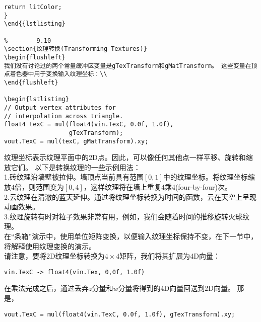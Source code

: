 \begin{lstlisting}[escapechar=^]
    return litColor;
}
\end{{lstlisting}

%------- 9.10 ---------------
\section{纹理转换(Transforming Textures)}
\begin{flushleft}
我们没有讨论过的两个常量缓冲区变量是gTexTransform和gMatTransform。 这些变量在顶点着色器中用于变换输入纹理坐标：\\
\end{flushleft}

\begin{lstlisting}
// Output vertex attributes for 
// interpolation across triangle.
float4 texC = mul(float4(vin.TexC, 0.0f, 1.0f),
                  gTexTransform);
vout.TexC = mul(texC, gMatTransform).xy;
\end{lstlisting}

\begin{flushleft}
纹理坐标表示纹理平面中的2D点。因此，可以像任何其他点一样平移、旋转和缩放它们。 以下是转换纹理的一些示例用法：\\
1.砖纹理沿墙壁被拉伸。墙顶点当前具有范围$[0,1]$中的纹理坐标。将纹理坐标缩放$4$倍，则范围变为$[0,4]$，这样纹理将在墙上重复4乘4(four-by-four)次。\\

2.云纹理在清澈的蓝天延伸。通过将纹理坐标转换为时间的函数，云在天空上呈现动画效果。\\

3.纹理旋转有时对粒子效果非常有用，例如，我们会随着时间的推移旋转火球纹理。\\

在“条箱”演示中，使用单位矩阵变换，以便输入纹理坐标保持不变，在下一节中，将解释使用纹理变换的演示。\\
请注意，要将2D纹理坐标转换为$4\times 4$矩阵，我们将其扩展为4D向量：\\
\end{flushleft}

\begin{lstlisting}
vin.TexC -> float4(vin.Tex, 0,0f, 1.0f)
\end{lstlisting}

\begin{flushleft}
在乘法完成之后，通过丢弃$z$分量和$w$分量将得到的4D向量回送到2D向量。 那是，\\
\end{flushleft}

\begin{lstlisting}
vout.TexC = mul(float4(vin.TexC, 0.0f, 1.0f), gTexTransform).xy;
\end{lstlisting}

